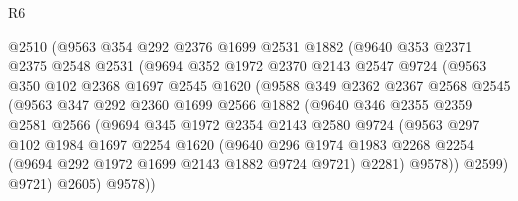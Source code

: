 \begin{lexlean}{R6}
\begin{coremodule}
                  @2510
                  (@9563
                    @354
                    @292
                    @2376
                    @1699
                    @2531
                    @1882
                    (@9640
                      @353
                      @2371
                      @2375
                      @2548
                      @2531
                      (@9694
                        @352
                        @1972
                        @2370
                        @2143
                        @2547
                        @9724
                        (@9563
                          @350
                          @102
                          @2368
                          @1697
                          @2545
                          @1620
                          (@9588
                            @349
                            @2362
                            @2367
                            @2568
                            @2545
                            (@9563
                              @347
                              @292
                              @2360
                              @1699
                              @2566
                              @1882
                              (@9640
                                @346
                                @2355
                                @2359
                                @2581
                                @2566
                                (@9694
                                  @345
                                  @1972
                                  @2354
                                  @2143
                                  @2580
                                  @9724
                                  (@9563
                                    @297
                                    @102
                                    @1984
                                    @1697
                                    @2254
                                    @1620
                                    (@9640
                                      @296
                                      @1974
                                      @1983
                                      @2268
                                      @2254
                                      (@9694 @292 @1972 @1699 @2143 @1882 @9724 @9721)
                                      @2281)
                                    @9578))
                                @2599)
                              @9721)
                            @2605)
                          @9578))

\end{coremodule}
\end{lexlean}
